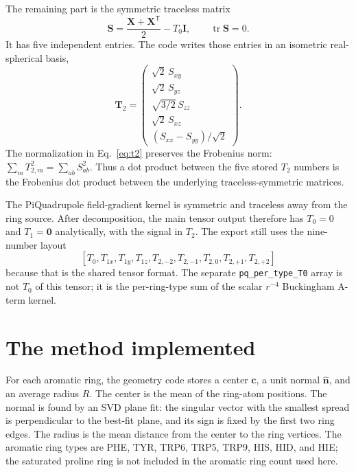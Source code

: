 \documentclass[11pt]{article}
\begin{document}
The remaining part is the symmetric traceless matrix
\begin{equation}
  \bm S =
  \frac{\bm X+\bm X^{\mathsf T}}{2} - T_0\bm I ,
  \qquad \operatorname{tr}\bm S = 0 .
  \label{eq:symmetric-traceless}
\end{equation}
It has five independent entries. The code writes those entries in an
isometric real-spherical basis,
\begin{equation}
  \bm T_2 =
  \begin{pmatrix}
    \sqrt{2}\,S_{xy}\\
    \sqrt{2}\,S_{yz}\\
    \sqrt{3/2}\,S_{zz}\\
    \sqrt{2}\,S_{xz}\\
    (S_{xx}-S_{yy})/\sqrt{2}
  \end{pmatrix}.
  \label{eq:t2}
\end{equation}
The normalization in Eq.~\eqref{eq:t2} preserves the Frobenius norm:
\(\sum_m T_{2,m}^2=\sum_{ab}S_{ab}^2\). Thus a dot product between the
five stored \(T_2\) numbers is the Frobenius dot product between the
underlying traceless-symmetric matrices.

The PiQuadrupole field-gradient kernel is symmetric and traceless away from
the ring source. After decomposition, the main tensor output therefore has
\(T_0=0\) and \(T_1=\bm0\) analytically, with the signal in \(T_2\). The
export still uses the nine-number layout
\[
  [T_0,T_{1x},T_{1y},T_{1z},
    T_{2,-2},T_{2,-1},T_{2,0},T_{2,+1},T_{2,+2}]
\]
because that is the shared tensor format. The separate
\texttt{pq\_per\_type\_T0} array is not \(T_0\) of this tensor; it is the
per-ring-type sum of the scalar \(r^{-4}\) Buckingham A-term kernel.

\section{The method implemented}

For each aromatic ring, the geometry code stores a center
\(\bm c\), a unit normal \(\hat{\bm n}\), and an average radius \(R\). The
center is the mean of the ring-atom positions. The normal is found by an SVD
plane fit: the singular vector with the smallest spread is perpendicular to
the best-fit plane, and its sign is fixed by the first two ring edges. The
radius is the mean distance from the center to the ring vertices. The aromatic
ring types are PHE, TYR, TRP6, TRP5, TRP9, HIS, HID, and HIE; the saturated
proline ring is not included in the aromatic ring count used here.
\end{document}
